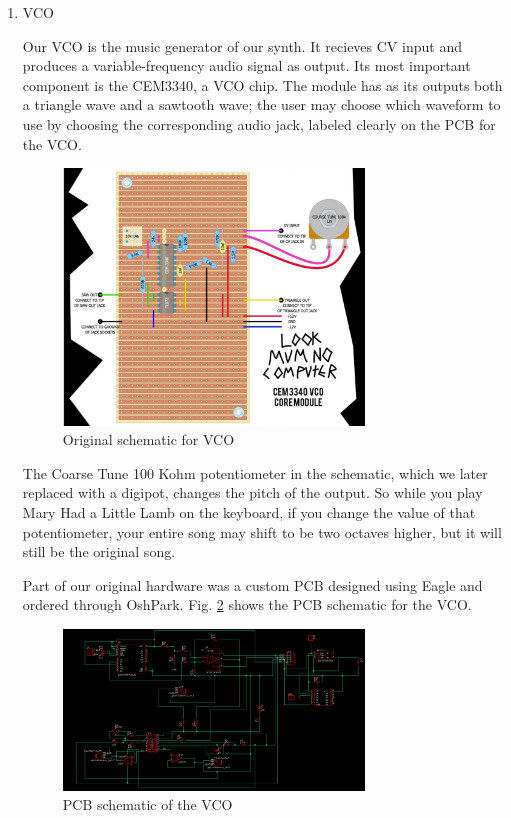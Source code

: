 \documentclass[letterpaper, 12 pt, conference]{ieeeconf}
\begin{document}
\begin{enumerate}
    \item VCO
    
    Our VCO is the music generator of our synth. It recieves CV input and produces a variable-frequency audio signal as output. Its most important component is the CEM3340, a VCO chip. The module has as its outputs both a triangle wave and a sawtooth wave; the user may choose which waveform to use by choosing the corresponding audio jack, labeled clearly on the PCB for the VCO.
    
    \begin{figure}[ht]
    \includegraphics[width=8cm]{VCO}
    \centering
    \caption{Original schematic for VCO \cite{VCO}}
    \label{vcofig}
    \end{figure}
    
    The Coarse Tune 100 Kohm potentiometer in the schematic, which we later replaced with a digipot, changes the pitch of the output. So while you play Mary Had a Little Lamb on the keyboard, if you change the value of that potentiometer, your entire song may shift to be two octaves higher, but it will still be the original song.
    
    Part of our original hardware was a custom PCB designed using Eagle and ordered through OshPark. Fig. \ref{schfig} shows the PCB schematic for the VCO.
    
    \begin{figure}[ht]
    \includegraphics[width=8cm]{images/pcbschem.png}
    \centering
    \caption{PCB schematic of the VCO}
    \label{schfig}
    \end{figure}


\end{enumerate}
\end{document}
